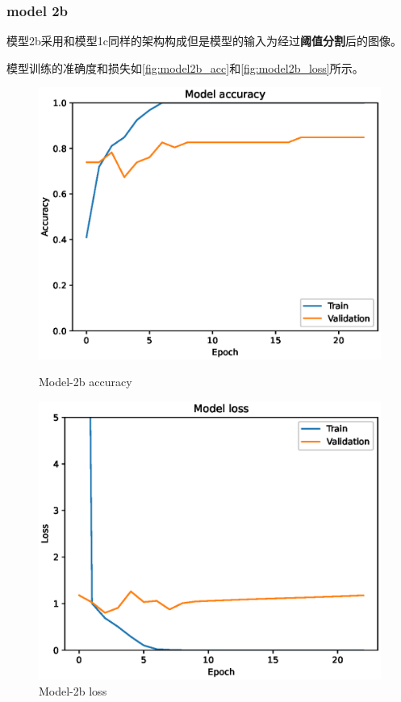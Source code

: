 \subsubsection{model 2b}

模型2b采用和模型1c同样的架构构成但是模型的输入为经过\textbf{阈值分割}后的图像。

模型训练的准确度和损失如\autoref{fig:model2b_acc}和\autoref{fig:model2b_loss}所示。

\begin{figure}
    \centering
    \begin{minipage}{0.45\textwidth}
        \centering
        \includegraphics[width=\textwidth]{./fig/model2/accuracy2b.eps}
        \caption{Model-2b accuracy}
        \label{fig:model2b_acc}
    \end{minipage}
    \begin{minipage}{0.45\textwidth}
        \centering
        \includegraphics[width=\textwidth]{./fig/model2/loss2b.eps}
        \caption{Model-2b loss}
        \label{fig:model2b_loss}
    \end{minipage}
\end{figure}


